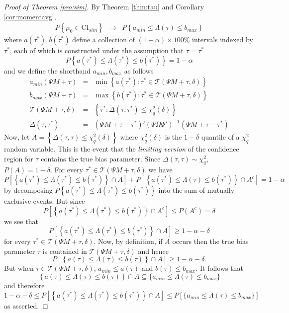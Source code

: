 \documentclass[12pt]{article}
\theoremstyle{definition}
\begin{document}
\begin{proof}[Proof of Theorem \ref{pro:sim}]
By Theorem \ref{thm:tau} and Corollary \ref{cor:momentavg},
\begin{eqnarray*}
	P\left\{\mu_0 \in \mbox{CI}_{sim} \right\} %
	&\rightarrow& P \left\{ a_{min} \leq \Lambda(\tau) \leq b_{max}\right\}
\end{eqnarray*}
where $a(\tau^*), b(\tau^*)$ define a collection of $(1-\alpha)\times 100\%$ intervals indexed by $\tau^*$, each of which is constructed under the assumption that $\tau = \tau^*$
$$P\left\{a(\tau^*) \leq \Lambda(\tau^*) \leq b(\tau^*) \right\} = 1-\alpha $$
and we define the shorthand $a_{min}, b_{max}$ as follows
	\begin{eqnarray*}
	a_{min}(\Psi M + \tau)&=&\min \left\{a(\tau^*)\colon \tau^* \in \mathscr{T}(\Psi M + \tau,\delta) \right\}\\
	b_{max}(\Psi M + \tau)&=&\max \left\{b(\tau^*)\colon \tau^* \in \mathscr{T}(\Psi M + \tau,\delta) \right\}\\
	\mathscr{T}(\Psi M + \tau,\delta) &=& \left\{\tau^* \colon  \Delta(\tau, \tau^*) \leq \chi^2_q(\delta) \right\}\\
	\Delta(\tau,\tau^*) &=&  (\Psi M + \tau - \tau^*)' (\Psi\Omega\Psi')^{-1} \left(\Psi M + \tau - \tau^*\right)
	\end{eqnarray*}
Now, let $A = \left\{ \Delta(\tau, \tau) \leq \chi^2_q(\delta) \right\}$ where $\chi^2_q(\delta)$ is the $1- \delta$ quantile of a $\chi^2_q$ random variable. 
This is the event that the \emph{limiting version} of the confidence region for $\tau$ contains the true bias parameter. 
Since $\Delta(\tau, \tau)\sim\chi^2_q$, $P(A) = 1 - \delta$. For every $\tau^*\in \mathscr{T}(\Psi M + \tau,\delta)$ we have
$$P\left[\left\{a(\tau^*) \leq \Lambda(\tau^*) \leq b(\tau^*)  \right\}\cap A \right] + P\left[\left\{a(\tau^*) \leq \Lambda(\tau) \leq b(\tau^*)  \right\}\cap A^c \right] = 1-\alpha$$
by decomposing $P\left\{a(\tau^*) \leq \Lambda(\tau^*) \leq b(\tau^*) \right\} $ into the sum of mutually exclusive events. 
But since
$$P\left[\left\{a(\tau^*) \leq \Lambda(\tau^*) \leq b(\tau^*)  \right\}\cap A^c \right] \leq P(A^c) = \delta$$
we see that
$$P\left[\left\{a(\tau^*) \leq \Lambda(\tau^*) \leq b(\tau^*)  \right\}\cap A \right]  
\geq 1-\alpha-\delta$$
for every $\tau^* \in \mathscr{T}(\Psi M + \tau,\delta)$. 
Now, by definition, if $A$ occurs then the true bias parameter $\tau$ is contained in $\mathscr{T}(\Psi M + \tau,\delta)$ and hence 
$$P\left[\left\{a(\tau) \leq \Lambda(\tau) \leq b(\tau)  \right\}\cap A \right]  
\geq 1-\alpha-\delta.$$
But when $\tau \in \mathscr{T}(\Psi M + \tau,\delta)$, $a_{min} \leq a(\tau)$ and $b(\tau) \leq b_{max}$. 
It follows that
	$$\left\{a(\tau) \leq \Lambda(\tau) \leq b(\tau)  \right\}\cap A \subseteq \{a_{min} \leq \Lambda(\tau) \leq b_{max}\}$$
and therefore
	$$1 -\alpha - \delta \leq P\left[\left\{a(\tau^*) \leq \Lambda(\tau^*) \leq b(\tau^*)  \right\}\cap A \right] \leq P\left[ \{a_{min} \leq \Lambda(\tau) \leq b_{max}\}\right]$$
as asserted.
\end{proof}
\end{document}
